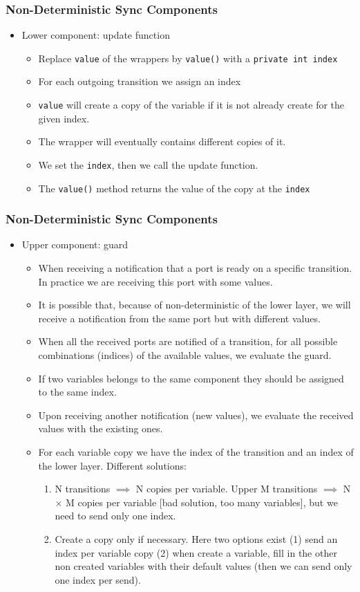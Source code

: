 \documentclass[compress,xcolor=dvipsnames,10pt]{beamer}
\begin{document}
\begin{frame}
 \frametitle{Non-Deterministic Sync Components}
 \begin{itemize}
  \item Lower component: update function

\begin{itemize}
 \item Replace \texttt{value} of the wrappers by \texttt{value()} with a \texttt{private int index}
\item For each outgoing transition we assign an index
\item \texttt{value} will create a copy of the variable if it is not already create for the given index. 
\item The wrapper will eventually contains different copies of it. 
\item We set the \texttt{index}, then we call the update function. 
\item The \texttt{value()} method returns the value of the copy at the \texttt{index}
\end{itemize}
\end{itemize}

\end{frame}
\begin{frame}
 \frametitle{Non-Deterministic Sync Components}
 \begin{itemize}
  \item Upper component: guard
\begin{itemize}
 \item When receiving a notification that a port is ready on a specific transition. In practice we are receiving this port with some values.
 \item It is possible that, because of non-deterministic of the lower layer, we will receive a notification from the same port but with different values. 
 \item When all the received ports are notified of a transition, for all possible combinations (indices) of the available values, we evaluate the guard.
 \item If two variables belongs to the same component they should be assigned to the same index. 
 \item Upon receiving another notification (new values), we evaluate the received values with the existing ones. 
 \item For each variable copy we have the index of the transition and an index of the lower layer. Different solutions: 
 \begin{enumerate}
  \item N transitions $\implies$ N copies per variable. Upper M transitions $\implies$ N $\times$ M copies per variable [bad solution, too many variables], but we need to send only one index. 
  \item Create a copy only if necessary. Here two options exist (1) send an index per variable copy (2) when create a variable, fill in the other non created variables with their default values (then we can send only one index per send).  
 \end{enumerate}

\end{itemize}
 \end{itemize}
\end{frame}
\end{document}
